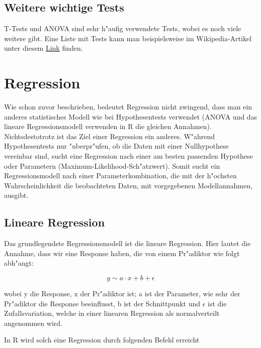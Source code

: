 \documentclass[a4paper,twoside]{tufte-book}\usepackage[]{graphicx}\usepackage[]{color}
\begin{document}
\subsection{Weitere wichtige Tests}

T-Tests und ANOVA sind sehr h"aufig verwendete Tests, wobei es noch viele weitere gibt. Eine Liste mit Tests kann man beispielsweise im Wikipedia-Artikel unter diesem \href{http://en.wikipedia.org/wiki/Category:Statistical_tests}{Link} finden.


\section{Regression}

Wie schon zuvor beschrieben, bedeutet Regression nicht zwingend, dass man ein anderes statistisches Modell wie bei Hypothesentests verwendet (ANOVA und das lineare Regressionsmodell verwenden in R die gleichen Annahmen). Nichtsdestotrotz ist das Ziel einer Regression ein anderes. W"ahrend Hypothesentests nur "uberpr"ufen, ob die Daten mit einer Nullhypothese vereinbar sind, sucht eine Regression nach einer am besten passenden Hypothese oder Parametern (Maximum-Likelihood-Sch"atzwert). Somit sucht ein Regressionsmodell nach einer Parameterkombination, die mit der h"ochsten Wahrscheinlichkeit die beobachteten Daten, mit vorgegebenen Modellannahmen, ausgibt.

\subsection{Lineare Regression}

Das grundlegendste Regressionsmodell ist die lineare Regression. Hier lautet die Annahme, dass wir eine Response haben, die von einem Pr"adiktor wie folgt abh"angt:

\begin{equation} \label{eq: linear regression}
y \sim a \cdot x + b + \epsilon 
\end{equation}

wobei y die Response, x der Pr"adiktor ist; a ist der Parameter, wie sehr der Pr"adiktor die Response beeinflusst, b ist der Schnittpunkt und $\epsilon$ ist die Zufallsvariation, welche in einer linearen Regression als normalverteilt angenommen wird.

In R wird solch eine Regression durch folgenden Befehl erreicht
\end{document}
